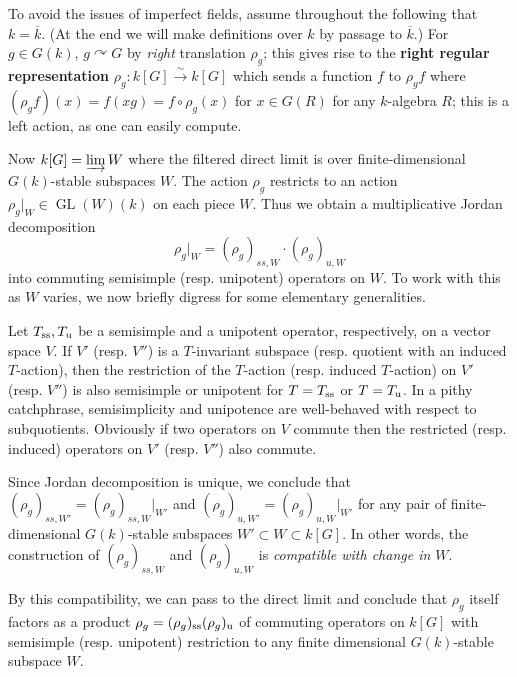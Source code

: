 \documentclass[10pt]{article}
\newcommand{\GL}{\operatorname{GL}}
\renewcommand{\(}{\left(}
\renewcommand{\)}{\right)}
\renewcommand{\bar}{\overline}
\newcommand{\actson}{\curvearrowright}
\numberwithin{thm}{subsection}
\begin{document}
To avoid the issues of imperfect fields, assume throughout 
the following that $k=\bar k$.  (At the end we will make definitions over
$k$ by passage to $\bar k$.) 
For $g\in G(k)$, $g\actson G$ by \textit{right} translation $\rho_g$;
this gives rise to the \textbf{right regular representation}
$\rho_g:k[G]\stackrel{\sim}{\to}k[G]$
which sends a function $f$ to $\rho_gf$
where $(\rho_gf)(x)=f(xg)=f\circ\rho_g(x)$
for $x\in G(R)$ for any $k$-algebra $R$;
this is a left action,
as one can easily compute.

Now $k[G]=\varinjlim W$
where the filtered direct limit is over finite-dimensional $G(k)$-stable
subspaces $W$.
The action $\rho_g$ restricts to an action $\rho_g|_W\in \GL(W)(k)$ on each piece $W$. Thus we obtain a multiplicative Jordan decomposition
\[\rho_g|_W=(\rho_g)_{ss,W}\cdot(\rho_g)_{u,W}\]
into commuting semisimple (resp. unipotent) operators on $W$.
To work with this as $W$ varies, we now briefly digress for some elementary generalities.

Let $T_{\rm{ss}},T_{\rm{u}}$ be a semisimple and a unipotent  operator, respectively,
on a vector space $V$.
If $V'$ (resp. $V''$) is a $T$-invariant
subspace (resp. quotient with an induced $T$-action),
then the restriction of the $T$-action
(resp. induced $T$-action) on $V'$ (resp. $V''$)
is also semisimple or unipotent
for $T=T_{\rm{ss}}$ or $T=T_{\rm{u}}$. In a pithy catchphrase,
semisimplicity and unipotence are well-behaved with respect to subquotients.
Obviously if two operators on $V$ commute then
the restricted (resp. induced) operators on $V'$ (resp. $V''$) also commute.

Since Jordan decomposition is unique,
we conclude that $(\rho_g)_{ss,W'}=(\rho_g)_{ss,W}|_{W'}$
and $(\rho_g)_{u,W'}=(\rho_g)_{u,W}|_{W'}$ 
for any pair of finite-dimensional $G(k)$-stable
subspaces $W'\subset W\subset k[G]$. 
In other words, the construction of $(\rho_g)_{ss,W}$
and $(\rho_g)_{u,W}$ is \textit{compatible with change in $W$}.

By this compatibility, we can pass to the direct limit and conclude
that $\rho_g$ itself factors as a product $\rho_g=(\rho_g)_{\rm{ss}}(\rho_g)_{\rm{u}}$
of commuting  operators on $k[G]$ with
semisimple (resp. unipotent) restriction
to any finite dimensional $G(k)$-stable subspace $W$.
\end{document}
